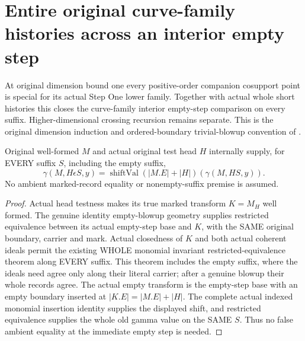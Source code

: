 \section{Entire original curve-family histories across an interior empty step}

At original dimension bound one every positive-order companion cosupport
point is special for its actual Step One lower family. Together with actual
whole short histories this closes the curve-family interior empty-step
comparison on every suffix. Higher-dimensional crossing recursion remains
separate. This is the original dimension induction and ordered-boundary
trivial-blowup convention of
\cite{wlodarczyk05-hironaka,bierstone-milman08-functoriality}.

\begin{lemma}
\label{hir:original-interior-all-tail-whole-monomial-transport}
\leanok
Original well-formed $M$ and actual original test head $H$ internally supply,
for EVERY suffix $S$, including the empty suffix,
\[
 \gamma(M,H\epsilon S,y)=\operatorname{shiftVal}(|M.E|+|H|)
                         (\gamma(M,HS,y)).
\]
No ambient marked-record equality or nonempty-suffix premise is assumed.
\end{lemma}
\begin{proof}
Actual head testness makes its true marked transform $K=M_H$ well formed.
The genuine identity empty-blowup geometry supplies restricted equivalence
between its actual empty-step base and $K$, with the SAME original boundary,
carrier and mark. Actual closedness of $K$ and both actual coherent ideals
permit the existing WHOLE monomial invariant restricted-equivalence theorem
along EVERY suffix. This theorem includes the empty suffix, where the ideals
need agree only along their literal carrier; after a genuine blowup their
whole records agree. The actual empty transform is the empty-step base with
an empty boundary inserted at $|K.E|=|M.E|+|H|$. The complete actual indexed
monomial insertion identity supplies the displayed shift, and restricted
equivalence supplies the whole old gamma value on the SAME $S$. Thus no false
ambient equality at the immediate empty step is needed.
\end{proof}

